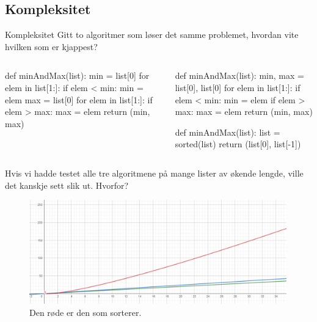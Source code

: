\subsection{Kompleksitet}
\begin{frame}[fragile]{Kompleksitet}
    Gitt to algoritmer som løser det samme problemet, hvordan vite hvilken som er kjappest?
    \begin{columns}
        \begin{column}{0.45\textwidth}
            \begin{python}
def minAndMax(list):
    min = list[0]
    for elem in list[1:]:
        if elem < min:
            min = elem
    max = list[0]
    for elem in list[1:]:
        if elem > max:
            max = elem
    return (min, max)
            \end{python}
        \end{column}
        \pause
        \begin{column}{0.45\textwidth}
            \begin{python}
def minAndMax(list):
    min, max = list[0], list[0]
    for elem in list[1:]:
        if elem < min: min = elem
        if elem > max: max = elem
    return (min, max)
    
def minAndMax(list):
    list = sorted(list)
    return (list[0], list[-1])
            \end{python}
        \end{column}
    \end{columns}    
\end{frame}
\begin{frame}[fragile]{}
    Hvis vi hadde testet alle tre algoritmene på mange lister av økende lengde, ville det kanskje sett slik ut. Hvorfor?
    \begin{figure}
        \centering
        \includegraphics[height = 4.5cm]{images/minmax.png}
        \caption{Den røde er den som sorterer.}
        \label{fig:minmax}
    \end{figure}    
\end{frame}

